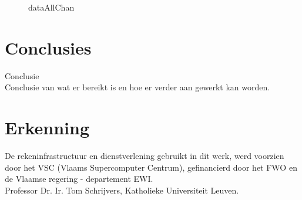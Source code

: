 \documentclass{article}
\begin{document}
\begin{figure}
	\caption{dataAllChan}
	\label{dataAllChan}
\end{figure}

\section{Conclusies}
Conclusie\cite{sortingNetworksSize2014}\\
Conclusie van wat er bereikt is en hoe er verder aan gewerkt kan worden.\cite{sortingNetworksTheEndGame}

\section*{Erkenning}
De rekeninfrastructuur en dienstverlening gebruikt in dit werk, werd voorzien door het VSC (Vlaams Supercomputer Centrum), gefinancierd door het FWO en de Vlaamse regering - departement EWI.\\
Professor Dr. Ir. Tom Schrijvers, Katholieke Universiteit Leuven.





\end{document}
